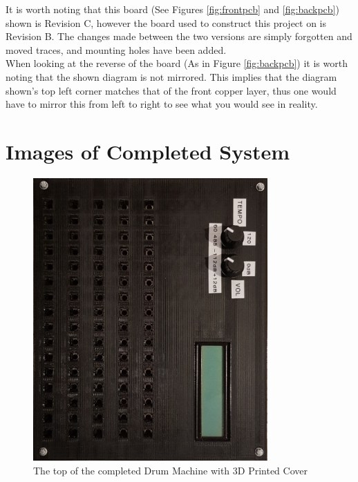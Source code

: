 \documentclass[12pt,a4paper]{report}
\begin{document}
\noindent It is worth noting that this board (See Figures \ref{fig:frontpcb} and \ref{fig:backpcb}) shown is Revision C, however the board used to construct this project on is Revision B. The changes made between the two versions are simply forgotten and moved traces, and mounting holes have been added.\\
When looking at the reverse of the board (As in Figure \ref{fig:backpcb}) it is worth noting that the shown diagram is not mirrored. This implies that the diagram shown's top left corner matches that of the front copper layer, thus one would have to mirror this from left to right to see what you would see in reality.
\chapter{Images of Completed System} \label{sec:photosSys}
\begin{figure}[h!]
	\centering
	\includegraphics[width=0.8\textwidth, angle=90]{front_Panel.jpg}
	\caption{The top of the completed Drum Machine with 3D Printed Cover}
\end{figure}
\end{document}
